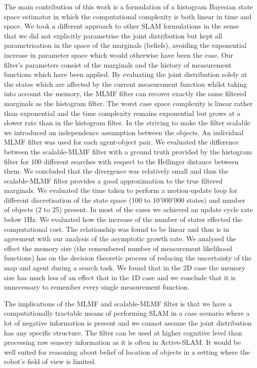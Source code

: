 \documentclass[review]{elsarticle}
\numberwithin{equation}{section}
\begin{document}
The main contribution of this work is a formulation of a histogram Bayesian state space estimator in which the computational complexity is 
both linear in time and space. We took a different approach to other SLAM formulations in the sense that we did not
explicitly parametrise the joint distribution but kept all parametrisation in the space of the marginals (beliefs),
avoiding the exponential increase in parameter space which would otherwise have been the case. Our filter's parameters 
consist of the marginals and the history of measurement functions which have been applied. By evaluating the joint 
distribution solely at the states which are affected by the current measurement function whilst taking into account the 
memory, the MLMF filter can recover exactly the same filtered marginals as the histogram filter. The worst case space complexity is 
linear rather than exponential and the time complexity remains exponential but grows at a slower rate than in the histogram filter.
In the striving to make the filter scalable we introduced an independence assumption between the objects. An individual MLMF filter
was used for each agent-object pair. We evaluated the difference between the scalable-MLMF filter with a ground truth provided 
by the histogram filter for 100 different searches with respect to the Hellinger distance between them. We concluded that 
the divergence was relatively small and thus the scalable-MLMF filter provides a good approximation to the true filtered
marginals. We evaluated the time taken to perform a motion-update loop for different discretisation of the state space (100 to 10'000'000 states) and 
number of objects (2 to 25) present. In most of the cases we achieved an update cycle rate below 1Hz. We evaluated how the increase of the number of states 
effected the computational cost. The relationship was found to be linear and thus is in agreement with our analysis of the asymptotic growth rate. 
We analysed the effect the memory size (the remembered number of measurement likelihood functions) has on the decision theoretic process of reducing
the uncertainty of the map and agent during a search task. We found that in the 2D case the memory size has much less of an effect that in the 1D case
and we conclude that it is unnecessary to remember every single measurement function.

The implications of the MLMF and scalable-MLMF filter is that we have a computationally tractable means of 
performing SLAM in a case scenario where a lot of negative information is present and  we cannot assume the 
joint distribution has any specific structure. The filter can be used at higher cognitive level than 
processing raw sensory information as it is often in Active-SLAM. It would be well suited for reasoning about belief 
of location of objects in a setting where the robot's field of view is limited.
\end{document}
